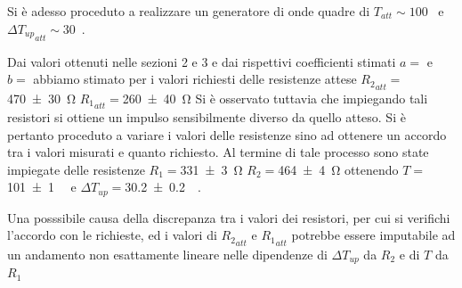 	Si è adesso proceduto a realizzare un generatore di onde quadre di $T_{att}\sim 100$\si{\mu \sec} e $ \Delta {T_{up}}_{att}\sim 30$\si{\mu \sec}.
	
	Dai valori ottenuti nelle sezioni 2 e 3 e  dai rispettivi coefficienti stimati $a=$ e $b=$
		abbiamo stimato per i valori richiesti delle resistenze attese 
	${R_{2}}_{att}=$\SI{470 \pm 30}{\ohm}%
	${R_{1}}_{att}=$\SI{260 \pm 40}{\ohm}%
	Si è osservato tuttavia che impiegando tali resistori si ottiene un impulso sensibilmente diverso da quello atteso.
	Si è pertanto proceduto a variare i valori delle resistenze sino ad ottenere un accordo tra i valori misurati e quanto richiesto.
	Al termine di tale processo sono state impiegate delle resistenze 
	$R_{1}=$\SI{331 \pm 3}{\ohm}
	$R_{2}=$\SI{464 \pm 4}{\ohm}
	ottenendo 
	$T=$\SI{101 \pm 1}{\mu \sec} e $ \Delta {T_{up}}=$\SI{30.2 \pm 0.2}{\mu \sec}.
	
	Una posssibile causa della discrepanza tra i valori dei resistori, per cui si verifichi l'accordo con le richieste, ed  i valori di ${R_{2}}_{att}$ e 	${R_{1}}_{att}$ potrebbe essere imputabile ad un andamento non esattamente lineare nelle dipendenze di $ \Delta T_{up}$ da $ R_{2}$ e di
	$T $ da $ R_{1} $